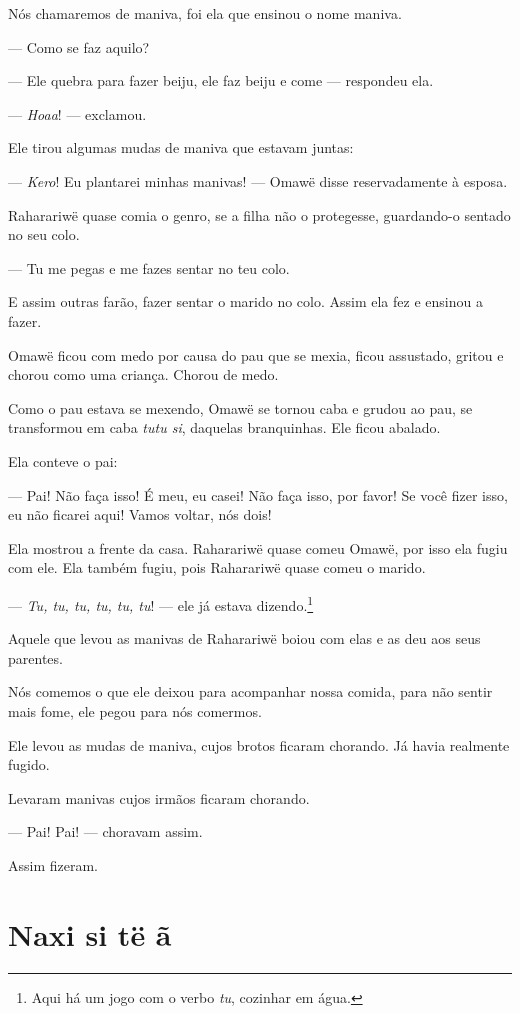 Nós chamaremos de maniva, foi ela que ensinou o nome maniva. 

--- Como se faz aquilo? 

--- Ele quebra para fazer beiju, ele faz beiju e come --- respondeu
ela. 

--- \textit{Hoaa}! --- exclamou. 

Ele tirou algumas mudas de maniva que estavam juntas:

--- \textit{Kero}! Eu plantarei minhas manivas! --- Omawë disse reservadamente à esposa. 

Raharariwë quase comia o genro, se a filha não o protegesse,
guardando-o sentado no seu colo. 

--- Tu me pegas e me fazes sentar no teu colo. 

E assim outras farão, fazer sentar o marido no colo. Assim ela fez e
ensinou a fazer. 

Omawë ficou com medo por causa do pau que se mexia, ficou assustado,
gritou e chorou como uma criança. Chorou de medo. 

Como o pau estava se mexendo, Omawë se tornou caba e grudou ao pau, se
transformou em caba \textit{tutu si}, daquelas branquinhas. Ele ficou
abalado. 

Ela conteve o pai: 

--- Pai! Não faça isso! É meu, eu casei! Não faça isso, por favor! Se
você fizer isso, eu não ficarei aqui! Vamos voltar, nós dois!

Ela mostrou a frente da casa. Raharariwë quase comeu Omawë, por isso ela
fugiu com ele. Ela também fugiu, pois Raharariwë quase comeu o marido. 

--- \textit{Tu, tu, tu, tu, tu, tu}! --- ele já estava dizendo.\footnote{Aqui há um jogo com o verbo \textit{tu}, cozinhar em água.}

Aquele que levou as manivas de Raharariwë boiou com elas e as deu aos
seus parentes. 

Nós comemos o que ele deixou para acompanhar nossa comida, para não
sentir mais fome, ele pegou para nós comermos. 

Ele levou as mudas de maniva, cujos brotos ficaram chorando. Já havia
realmente fugido. 

Levaram manivas cujos irmãos ficaram chorando. 

--- Pai! Pai! --- choravam assim. 

Assim fizeram.

\chapter{Naxi si të ã}

